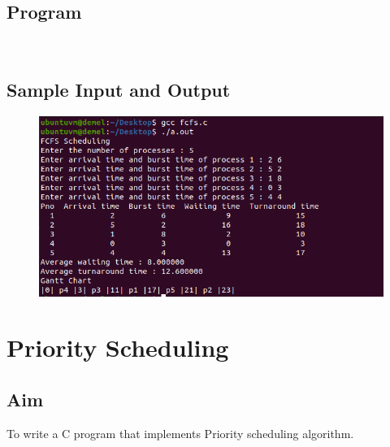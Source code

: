 \documentclass[a4paper]{article}
\begin{document}
\subsection{Program}

\\

\subsection{Sample Input and Output\\}
\begin{figure}[!h]
	\centering
	\includegraphics[width=\textwidth]{fcfs.png}
\end{figure}


\section{Priority Scheduling}

\subsection{Aim}
To write a C program that implements Priority scheduling algorithm.
\end{document}
